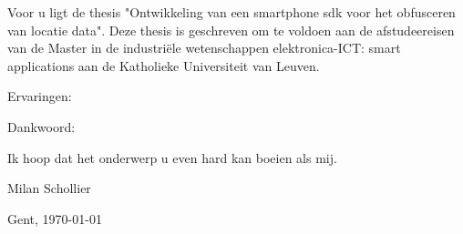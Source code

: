 Voor u ligt de thesis "Ontwikkeling van een smartphone sdk voor het obfusceren van locatie data". Deze thesis is geschreven om te voldoen aan de afstudeereisen van de Master in de
industriële wetenschappen elektronica-ICT:
smart applications aan de Katholieke Universiteit van Leuven.

Ervaringen:

Dankwoord:

Ik hoop dat het onderwerp u even hard kan boeien als mij.

Milan Schollier

Gent, \today